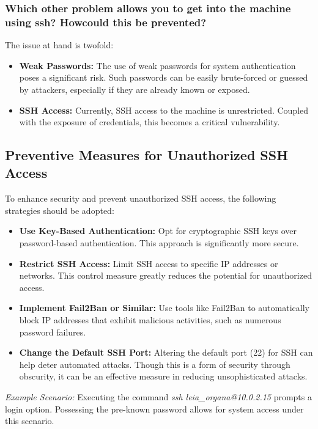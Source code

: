 \subsubsection{Which other problem allows you to get into the machine using ssh? Howcould this be prevented?}
The issue at hand is twofold:

\begin{itemize}
    \item \textbf{Weak Passwords:} The use of weak passwords for system authentication poses a significant risk. Such passwords can be easily brute-forced or guessed by attackers, especially if they are already known or exposed.

    \item \textbf{SSH Access:} Currently, SSH access to the machine is unrestricted. Coupled with the exposure of credentials, this becomes a critical vulnerability.
\end{itemize}

\subsection*{Preventive Measures for Unauthorized SSH Access}
To enhance security and prevent unauthorized SSH access, the following strategies should be adopted:

\begin{itemize}
    \item \textbf{Use Key-Based Authentication:} Opt for cryptographic SSH keys over password-based authentication. This approach is significantly more secure.

    \item \textbf{Restrict SSH Access:} Limit SSH access to specific IP addresses or networks. This control measure greatly reduces the potential for unauthorized access.

    \item \textbf{Implement Fail2Ban or Similar:} Use tools like Fail2Ban to automatically block IP addresses that exhibit malicious activities, such as numerous password failures.

    \item \textbf{Change the Default SSH Port:} Altering the default port (22) for SSH can help deter automated attacks. Though this is a form of security through obscurity, it can be an effective measure in reducing unsophisticated attacks.
\end{itemize}

\textit{Example Scenario:} Executing the command \textit{ssh leia\_organa@10.0.2.15} prompts a login option. Possessing the pre-known password allows for system access under this scenario.


